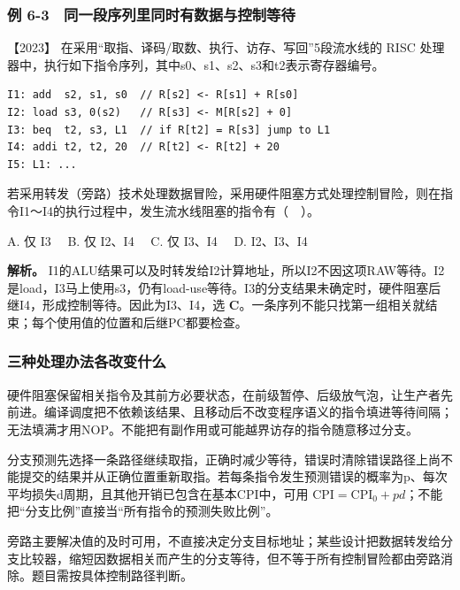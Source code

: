 \subsubsection{例 6-3　同一段序列里同时有数据与控制等待}\label{co-ex6-3}

\noindent{}【2023】 在采用``取指、译码/取数、执行、访存、写回''5段流水线的 RISC 处理器中，执行如下指令序列，其中s0、s1、s2、s3和t2表示寄存器编号。

\par\medskip\noindent
\begin{minipage}{\linewidth}
\begin{verbatim}
I1: add  s2, s1, s0  // R[s2] <- R[s1] + R[s0]
I2: load s3, 0(s2)   // R[s3] <- M[R[s2] + 0]
I3: beq  t2, s3, L1  // if R[t2] = R[s3] jump to L1
I4: addi t2, t2, 20  // R[t2] <- R[t2] + 20
I5: L1: ...
\end{verbatim}
\end{minipage}\par\medskip

若采用转发（旁路）技术处理数据冒险，采用硬件阻塞方式处理控制冒险，则在指令I1～I4的执行过程中，发生流水线阻塞的指令有（　）。

A. 仅 I3　 B. 仅 I2、I4　 C. 仅 I3、I4　 D. I2、I3、I4


\textbf{解析。} I1的ALU结果可以及时转发给I2计算地址，所以I2不因这项RAW等待。I2是load，I3马上使用s3，仍有load-use等待。I3的分支结果未确定时，硬件阻塞后继I4，形成控制等待。因此为I3、I4，选 \textbf{C}。一条序列不能只找第一组相关就结束；每个使用值的位置和后继PC都要检查。

\subsubsection{三种处理办法各改变什么}\label{ux4e09ux79cdux5904ux7406ux529eux6cd5ux5404ux6539ux53d8ux4ec0ux4e48}

硬件阻塞保留相关指令及其前方必要状态，在前级暂停、后级放气泡，让生产者先前进。编译调度把不依赖该结果、且移动后不改变程序语义的指令填进等待间隔；无法填满才用NOP。不能把有副作用或可能越界访存的指令随意移过分支。

分支预测先选择一条路径继续取指，正确时减少等待，错误时清除错误路径上尚不能提交的结果并从正确位置重新取指。若每条指令发生预测错误的概率为p、每次平均损失d周期，且其他开销已包含在基本CPI中，可用 \(\mathrm{CPI}=\mathrm{CPI}_{0}+pd\)；不能把``分支比例''直接当``所有指令的预测失败比例''。

旁路主要解决值的及时可用，不直接决定分支目标地址；某些设计把数据转发给分支比较器，缩短因数据相关而产生的分支等待，但不等于所有控制冒险都由旁路消除。题目需按具体控制路径判断。

